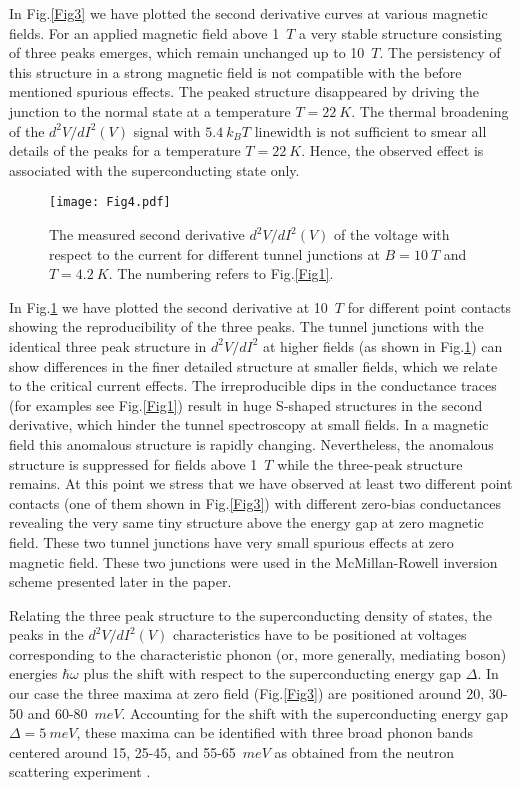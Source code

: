 \documentclass[twocolumn,amsmath,floats,showpacs,nofootinbib]{revtex4}
\begin{document}
In Fig.\ref{Fig3} we have plotted the second derivative curves at various magnetic fields. For an applied magnetic field above 1~$T$ a very stable structure consisting of three peaks emerges, which remain unchanged up to 10~$T$. The persistency of this structure in a strong magnetic field is not compatible with the before mentioned spurious effects. The peaked structure disappeared by driving the junction to the normal state at a temperature $T = 22\ K$. The thermal broadening of the $d^2V/dI^2(V)$ signal with $5.4\ k_BT$ linewidth \cite{18} is not sufficient to smear all details of the peaks for a temperature $T = 22\ K$. Hence, the observed effect is associated with the superconducting state only.

\begin{figure}[]
\texttt{[image: Fig4.pdf]}
\caption[]{The measured second derivative $d^2V/dI^2(V)$ of the voltage with respect to the current for different tunnel junctions at $B=10\ T$ and $T=4.2\ K$. The numbering refers to Fig.\ref{Fig1}.}
\label{Fig4}
\end{figure}

In Fig.\ref{Fig4} we have plotted the second derivative at 10~$T$ for different point contacts showing the reproducibility of the three peaks. The tunnel junctions with the identical three peak structure in $d^2V/dI^2$ at higher fields (as shown in Fig.\ref{Fig4}) can show differences in the finer detailed structure at smaller fields, which we relate to the critical current effects. The irreproducible dips in the conductance traces (for examples see Fig.\ref{Fig1}) result in huge S-shaped structures in the second derivative, which hinder the tunnel spectroscopy at small fields. In a magnetic
field this anomalous structure is rapidly changing. Nevertheless, the anomalous structure is suppressed for fields above 1~$T$ while the three-peak structure remains. At this point we stress that we have observed at least two different point contacts (one of them shown in Fig.\ref{Fig3}) with different zero-bias conductances revealing the very same tiny structure above the energy gap at zero magnetic field. These two tunnel junctions have very small spurious effects at zero magnetic field. These two junctions were used in the McMillan-Rowell inversion scheme presented later in the paper.

Relating the three peak structure to the superconducting density of states, the peaks in the $d^2V/dI^2(V)$ characteristics have to be positioned at voltages corresponding to the characteristic phonon (or, more generally, mediating boson) energies $\hbar\omega$ plus the shift with respect to the superconducting energy gap $\Delta$. In our case the three maxima at zero field (Fig.\ref{Fig3}) are positioned around 20, 30-50 and 60-80~$meV$. Accounting for the shift with the superconducting energy gap $\Delta= 5\ meV$, these maxima can be identified with three broad phonon bands centered around 15, 25-45, and 55-65~$meV$ as obtained from the neutron scattering experiment \cite{13}.
\end{document}
